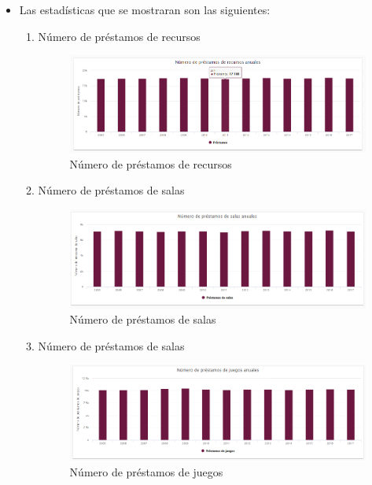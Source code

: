 \begin{itemize}
	\item  Las estadísticas que se mostraran son las siguientes:
	\begin{enumerate}
		
		\item Número de préstamos de recursos
		\begin{figure}[hbtp]
	\includegraphics[scale=0.7]{images/Interfaz/IUGS15_recursosTodos.PNG}
	\caption{Número de préstamos de recursos}
	\end{figure}
	
	\item Número de préstamos de salas
	\begin{figure}[hbtp]
	\includegraphics[scale=0.7]{images/Interfaz/IUGS15_salasTodos.PNG}
	\caption{Número de préstamos de salas}
	\end{figure}
	
	\item Número de préstamos de salas
	\begin{figure}[hbtp]
	\includegraphics[scale=0.7]{images/Interfaz/IUGS15_juegosTodos.PNG}
	\caption{Número de préstamos de juegos}
	\end{figure}
	

\end{enumerate}
\end{itemize}
